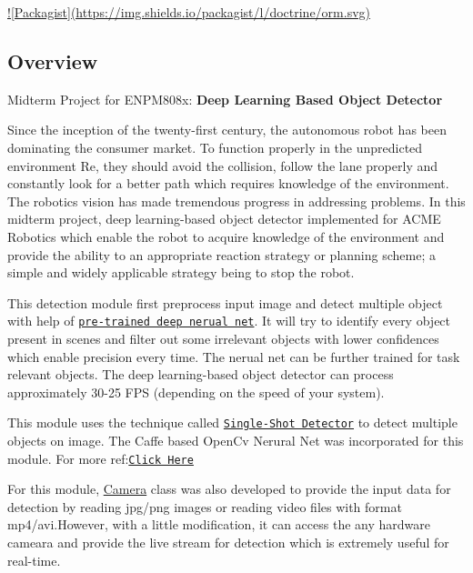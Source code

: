 \href{https://travis-ci.org/raviBhadeshiya/enpm808x-robotics-detection-module}{\tt } \href{https://coveralls.io/github/raviBhadeshiya/enpm808x-robotics-detection-module?branch=master}{\tt } \hyperlink{_l_i_c_e_n_s_e_8md}{!\mbox{[}Packagist\mbox{]}(https\+://img.shields.io/packagist/l/doctrine/orm.svg)} 



\subsection*{Overview}

Midterm Project for E\+N\+P\+M808x\+: {\bfseries Deep Learning Based Object Detector}

Since the inception of the twenty-\/first century, the autonomous robot has been dominating the consumer market. To function properly in the unpredicted environment Re, they should avoid the collision, follow the lane properly and constantly look for a better path which requires knowledge of the environment. The robotics vision has made tremendous progress in addressing problems. In this midterm project, deep learning-\/based object detector implemented for A\+C\+ME Robotics which enable the robot to acquire knowledge of the environment and provide the ability to an appropriate reaction strategy or planning scheme; a simple and widely applicable strategy being to stop the robot.


\begin{DoxyItemize}
\item This detection module first preprocess input image and detect multiple object with help of \href{https://github.com/weiliu89/caffe/tree/ssd#models}{\tt pre-\/trained deep nerual net}. It will try to identify every object present in scenes and filter out some irrelevant objects with lower confidences which enable precision every time. The nerual net can be further trained for task relevant objects. The deep learning-\/based object detector can process approximately 30-\/25 F\+PS (depending on the speed of your system).
\item This module uses the technique called \href{https://arxiv.org/abs/1512.02325}{\tt Single-\/\+Shot Detector} to detect multiple objects on image. The Caffe based Open\+Cv Nerural Net was incorporated for this module. For more ref\+:\href{https://github.com/weiliu89/caffe/}{\tt Click Here}
\item For this module, \hyperlink{class_camera}{Camera} class was also developed to provide the input data for detection by reading jpg/png images or reading video files with format mp4/avi.\+However, with a little modification, it can access the any hardware cameara and provide the live stream for detection which is extremely useful for real-\/time.
\end{DoxyItemize}

